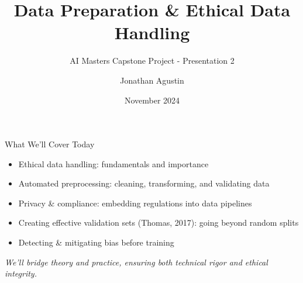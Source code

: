 \documentclass[aspectratio=169]{beamer}
\title{Data Preparation \& Ethical Data Handling}
\subtitle{AI Masters Capstone Project - Presentation 2}
\author{Jonathan Agustin}
\date{November 2024}
\begin{document}
%
%
\maketitle

%
\begin{frame}{What We’ll Cover Today}
\begin{itemize}
\item Ethical data handling: fundamentals and importance
\item Automated preprocessing: cleaning, transforming, and validating data
\item Privacy \& compliance: embedding regulations into data pipelines
\item Creating effective validation sets (Thomas, 2017): going beyond random splits
\item Detecting \& mitigating bias before training
\end{itemize}

\vspace{0.8em}
\emph{We’ll bridge theory and practice, ensuring both technical rigor and ethical integrity.}
\end{frame}
\end{document}
